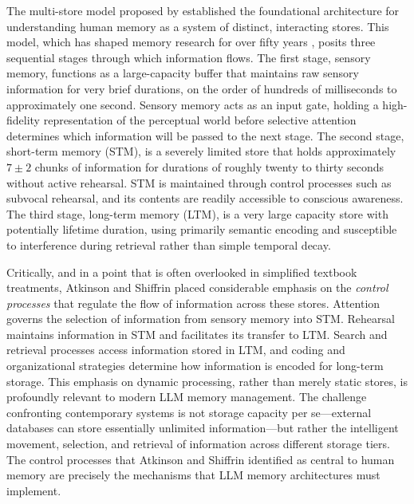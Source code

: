 The multi-store model proposed by \citet{atkinson1968human} established the foundational architecture for understanding human memory as a system of distinct, interacting stores. This model, which has shaped memory research for over fifty years \citep{neath2019fifty}, posits three sequential stages through which information flows. The first stage, sensory memory, functions as a large-capacity buffer that maintains raw sensory information for very brief durations, on the order of hundreds of milliseconds to approximately one second. Sensory memory acts as an input gate, holding a high-fidelity representation of the perceptual world before selective attention determines which information will be passed to the next stage. The second stage, short-term memory (STM), is a severely limited store that holds approximately $7 \pm 2$ chunks of information \citep{miller1956magical} for durations of roughly twenty to thirty seconds without active rehearsal. STM is maintained through control processes such as subvocal rehearsal, and its contents are readily accessible to conscious awareness. The third stage, long-term memory (LTM), is a very large capacity store with potentially lifetime duration, using primarily semantic encoding and susceptible to interference during retrieval rather than simple temporal decay.

Critically, and in a point that is often overlooked in simplified textbook treatments, Atkinson and Shiffrin placed considerable emphasis on the \emph{control processes} that regulate the flow of information across these stores. Attention governs the selection of information from sensory memory into STM. Rehearsal maintains information in STM and facilitates its transfer to LTM. Search and retrieval processes access information stored in LTM, and coding and organizational strategies determine how information is encoded for long-term storage. This emphasis on dynamic processing, rather than merely static stores, is profoundly relevant to modern LLM memory management. The challenge confronting contemporary systems is not storage capacity per se---external databases can store essentially unlimited information---but rather the intelligent movement, selection, and retrieval of information across different storage tiers. The control processes that Atkinson and Shiffrin identified as central to human memory are precisely the mechanisms that LLM memory architectures must implement.

